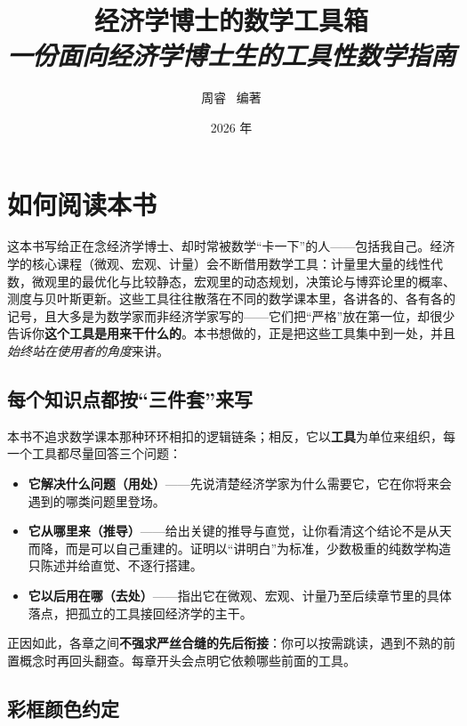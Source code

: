 \documentclass[oneside,fontset=macnew,UTF8]{ctexbook}
\def\notetitle{经济学博士的数学工具箱}
\def\notesubtitle{一份面向经济学博士生的工具性数学指南}
\def\noteauthor{周睿 \ 编著}
\def\notedate{2026 年}
\begin{document}
\title{\textbf{
    \LARGE{\notetitle}\\
    \vspace{0.5em}
    \large\textit{\notesubtitle}
    \vspace*{8\baselineskip}}
}
\author{\noteauthor}
\date{\notedate}

\maketitle
\newpage

\thispagestyle{empty}
\section*{如何阅读本书}

这本书写给正在念经济学博士、却时常被数学``卡一下''的人——包括我自己。经济学的核心课程（微观、宏观、计量）会不断借用数学工具：计量里大量的线性代数，微观里的最优化与比较静态，宏观里的动态规划，决策论与博弈论里的概率、测度与贝叶斯更新。这些工具往往散落在不同的数学课本里，各讲各的、各有各的记号，且大多是为数学家而非经济学家写的——它们把``严格''放在第一位，却很少告诉你\textbf{这个工具是用来干什么的}。本书想做的，正是把这些工具集中到一处，并且\emph{始终站在使用者的角度}来讲。

\subsection*{每个知识点都按``三件套''来写}

本书不追求数学课本那种环环相扣的逻辑链条；相反，它以\textbf{工具}为单位来组织，每一个工具都尽量回答三个问题：

\begin{itemize}
    \item \textbf{它解决什么问题（用处）}——先说清楚经济学家为什么需要它，它在你将来会遇到的哪类问题里登场。
    \item \textbf{它从哪里来（推导）}——给出关键的推导与直觉，让你看清这个结论不是从天而降，而是可以自己重建的。证明以``讲明白''为标准，少数极重的纯数学构造只陈述并给直觉、不逐行搭建。
    \item \textbf{它以后用在哪（去处）}——指出它在微观、宏观、计量乃至后续章节里的具体落点，把孤立的工具接回经济学的主干。
\end{itemize}

正因如此，各章之间\textbf{不强求严丝合缝的先后衔接}：你可以按需跳读，遇到不熟的前置概念时再回头翻查。每章开头会点明它依赖哪些前面的工具。

\subsection*{彩框颜色约定}
\end{document}
